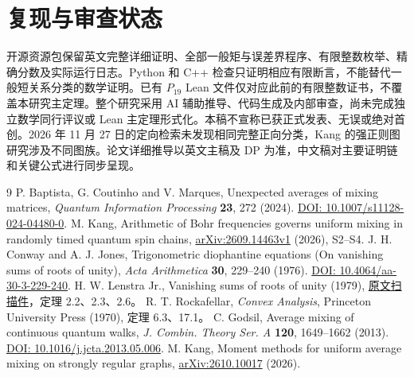 \documentclass[UTF8,fontset=none,11pt]{ctexart}
\begin{document}
\section{复现与审查状态}
开源资源包保留英文完整详细证明、全部一般矩与误差界程序、有限整数枚举、精确分数及实际运行日志。Python 和 C++ 检查只证明相应有限断言，不能替代一般短关系分类的数学证明。已有 $P_{19}$ Lean 文件仅对应此前的有限整数证书，不覆盖本研究主定理。整个研究采用 AI 辅助推导、代码生成及内部审查，尚未完成独立数学同行评议或 Lean 主定理形式化。本稿不宣称已获正式发表、无误或绝对首创。2026 年 11 月 27 日的定向检索未发现相同完整正向分类，Kang 的强正则图研究\cite{kang2}涉及不同图族。论文详细推导以英文主稿及 DP 为准，中文稿对主要证明链和关键公式进行同步呈现。
\begin{thebibliography}{9}\small
{} P. Baptista, G. Coutinho and V. Marques, Unexpected averages of mixing matrices, \emph{Quantum Information Processing} \textbf{23}, 272 (2024). \href{https://doi.org/10.1007/s11128-024-04480-0}{DOI: 10.1007/s11128-024-04480-0}.
 M. Kang, Arithmetic of Bohr frequencies governs uniform mixing in randomly timed quantum spin chains, \href{https://arxiv.org/abs/2609.14463}{arXiv:2609.14463v1} (2026), S2--S4.
 J. H. Conway and A. J. Jones, Trigonometric diophantine equations (On vanishing sums of roots of unity), \emph{Acta Arithmetica} \textbf{30}, 229--240 (1976). \href{https://doi.org/10.4064/aa-30-3-229-240}{DOI: 10.4064/aa-30-3-229-240}.
 H. W. Lenstra Jr., Vanishing sums of roots of unity (1979), \href{https://pub.math.leidenuniv.nl/~lenstrahw/PUBLICATIONS/1979d/art.pdf}{原文扫描件}，定理 2.2、2.3、2.6。
 R. T. Rockafellar, \emph{Convex Analysis}, Princeton University Press (1970), 定理 6.3、17.1。
 C. Godsil, Average mixing of continuous quantum walks, \emph{J. Combin. Theory Ser. A} \textbf{120}, 1649--1662 (2013). \href{https://doi.org/10.1016/j.jcta.2013.05.006}{DOI: 10.1016/j.jcta.2013.05.006}.
 M. Kang, Moment methods for uniform average mixing on strongly regular graphs, \href{https://arxiv.org/abs/2610.10017}{arXiv:2610.10017} (2026).
\end{thebibliography}
\end{document}
